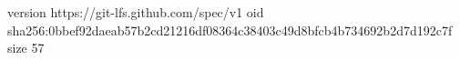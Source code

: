 version https://git-lfs.github.com/spec/v1
oid sha256:0bbef92daeab57b2cd21216df08364c38403c49d8bfcb4b734692b2d7d192c7f
size 57
